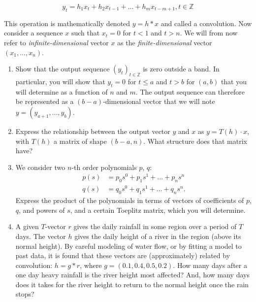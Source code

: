 \documentclass[11pt]{article}
\begin{document}
\[y_t = h_1x_t + h_2x_{t-1} + ... + h_mx_{t-m+1},  t \in \mathbb{Z}\]

This operation is mathematically denoted $y = h * x$ and called a convolution. Now consider a sequence $x$ such that $x_t = 0$ for $t < 1$ and $t > n$. We will from now refer to \emph{infinite-dimensional} vector $x$ as the \emph{finite-dimensional} vector $(x_1, ..., x_n)$.

\begin{enumerate}
    \item Show that the output sequence $(y_t)_{t \in \mathbb{Z}}$ is zero outside a band. In particular, you will show that $y_t = 0$ for $t \leq a$ and $t > b$ for $(a, b)$ that you will determine as a function of $n$ and $m$. The output sequence can therefore be represented as a $(b-a)$-dimensional vector that we will note $y = (y_{a+1}, ..., y_{b})$.

    \item Express the relationship between the output vector $y$ and $x$ as $y = T(h) \cdot x$, with $T(h)$ a matrix of shape $(b-a, n)$. What structure does that matrix have?

    \item We consider two $n$-th order polynomials $p$, $q$:
    \begin{align*}
        p(s) &= p_0s^0 + p_1s^1 + ... + p_ns^n \\
        q(s) &= q_0s^0 + q_1s^1 + ... + q_ns^n.
    \end{align*}
    Express the product of the polynomials in terms of vectors of coefficients of $p$, $q$, and powers of $s$, and a certain Toeplitz matrix, which you will determine.

    \item A given $T$-vector $r$ gives the daily rainfall in some region over a period of $T$ days. The vector $h$ gives the daily height of a river in the region (above its normal height). By careful modeling of water flow, or by fitting a model to past data, it is found that these vectors are (approximately) related by convolution: $h=g*r$, where $g= (0.1,0.4,0.5,0.2)$. How  many days  after a  one day heavy rainfall is the river height most affected? And, how many days does it takes for the river height to return to the normal height once the rain stops?
\end{enumerate}

\begin{solution}
\end{solution}
\end{document}
